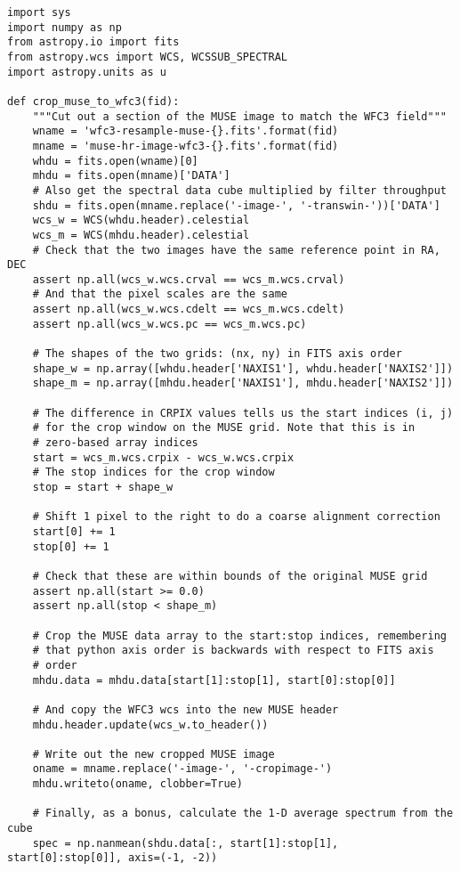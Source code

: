 \documentclass[11pt]{article}
\begin{document}
\begin{verbatim}
import sys
import numpy as np
from astropy.io import fits
from astropy.wcs import WCS, WCSSUB_SPECTRAL
import astropy.units as u

def crop_muse_to_wfc3(fid):
    """Cut out a section of the MUSE image to match the WFC3 field"""
    wname = 'wfc3-resample-muse-{}.fits'.format(fid)
    mname = 'muse-hr-image-wfc3-{}.fits'.format(fid)
    whdu = fits.open(wname)[0]
    mhdu = fits.open(mname)['DATA']
    # Also get the spectral data cube multiplied by filter throughput
    shdu = fits.open(mname.replace('-image-', '-transwin-'))['DATA']
    wcs_w = WCS(whdu.header).celestial
    wcs_m = WCS(mhdu.header).celestial
    # Check that the two images have the same reference point in RA, DEC
    assert np.all(wcs_w.wcs.crval == wcs_m.wcs.crval)
    # And that the pixel scales are the same
    assert np.all(wcs_w.wcs.cdelt == wcs_m.wcs.cdelt)
    assert np.all(wcs_w.wcs.pc == wcs_m.wcs.pc)

    # The shapes of the two grids: (nx, ny) in FITS axis order
    shape_w = np.array([whdu.header['NAXIS1'], whdu.header['NAXIS2']])
    shape_m = np.array([mhdu.header['NAXIS1'], mhdu.header['NAXIS2']])

    # The difference in CRPIX values tells us the start indices (i, j)
    # for the crop window on the MUSE grid. Note that this is in
    # zero-based array indices
    start = wcs_m.wcs.crpix - wcs_w.wcs.crpix
    # The stop indices for the crop window 
    stop = start + shape_w

    # Shift 1 pixel to the right to do a coarse alignment correction
    start[0] += 1
    stop[0] += 1

    # Check that these are within bounds of the original MUSE grid
    assert np.all(start >= 0.0)
    assert np.all(stop < shape_m)

    # Crop the MUSE data array to the start:stop indices, remembering
    # that python axis order is backwards with respect to FITS axis
    # order
    mhdu.data = mhdu.data[start[1]:stop[1], start[0]:stop[0]]

    # And copy the WFC3 wcs into the new MUSE header
    mhdu.header.update(wcs_w.to_header())

    # Write out the new cropped MUSE image
    oname = mname.replace('-image-', '-cropimage-')
    mhdu.writeto(oname, clobber=True)

    # Finally, as a bonus, calculate the 1-D average spectrum from the cube
    spec = np.nanmean(shdu.data[:, start[1]:stop[1], start[0]:stop[0]], axis=(-1, -2))


\end{verbatim}
\end{document}
